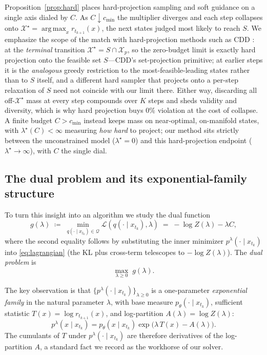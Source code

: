 \documentclass{article}
\DeclareMathOperator*{\argmax}{arg\,max}
\newcommand{\X}{\mathcal{X}}
\newcommand{\Q}{\mathcal{Q}}
\newcommand{\lstar}{\lambda^{\star}}
\newcommand{\qlam}{p^{\lambda}(\cdot\mid x_{t_k})}
\begin{document}
Proposition~\ref{prop:hard} places hard-projection sampling and soft guidance on a single axis dialed by $C$. As $C\downarrow c_{\min}$ the multiplier diverges and each step collapses onto $\X^\star=\argmax_x r_{t_{k+1}}(x)$, the next states judged most likely to reach $S$. We emphasize the scope of the match with hard-projection methods such as CDD \cite{cardei2025cdd}: at the \emph{terminal} transition $\X^\star=S\cap\X_p$, so the zero-budget limit is exactly hard projection onto the feasible set $S$---CDD's set-projection primitive; at earlier steps it is the \emph{analogous} greedy restriction to the most-feasible-leading states rather than to $S$ itself, and a different hard sampler that projects onto a per-step relaxation of $S$ need not coincide with our limit there. Either way, discarding all off-$\X^\star$ mass at every step compounds over $K$ steps and sheds validity and diversity, which is why hard projection buys $0\%$ violation at the cost of collapse. A finite budget $C>c_{\min}$ instead keeps mass on near-optimal, on-manifold states, with $\lstar(C)<\infty$ measuring \emph{how hard} to project; our method sits strictly between the unconstrained model ($\lstar=0$) and this hard-projection endpoint ($\lstar\to\infty$), with $C$ the single dial.

\subsection{The dual problem and its exponential-family structure}
To turn this insight into an algorithm we study the dual function
\begin{equation}
\label{eq:dual}
g(\lambda)\;\coloneqq\;\min_{q(\cdot\mid x_{t_k})\in\Q}\mathcal L(q(\cdot\mid x_{t_k}),\lambda)
\;=\;-\log Z(\lambda)-\lambda C,
\end{equation}
where the second equality follows by substituting the inner minimizer $\qlam$ into \eqref{eq:lagrangian} (the KL plus cross-term telescopes to $-\log Z(\lambda)$). The \emph{dual problem} is
\begin{equation}
\label{eq:dual-problem}
\max_{\lambda\ge 0}\; g(\lambda).
\end{equation}

The key observation is that $\{\qlam\}_{\lambda\ge0}$ is a one-parameter \emph{exponential family} in the natural parameter $\lambda$, with base measure $p_\theta(\cdot\mid x_{t_k})$, sufficient statistic $T(x)=\log r_{t_{k+1}}(x)$, and log-partition $A(\lambda)=\log Z(\lambda)$:
\begin{equation}
p^{\lambda}(x\mid x_{t_k})=p_\theta(x\mid x_{t_k})\exp\!\big(\lambda\,T(x)-A(\lambda)\big).
\end{equation}
The cumulants of $T$ under $\qlam$ are therefore derivatives of the log-partition $A$, a standard fact we record as the workhorse of our solver.
\end{document}
